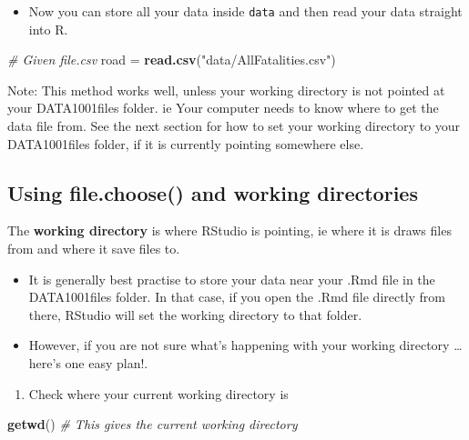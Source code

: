 \documentclass[]{article}
\newenvironment{Shaded}{\begin{snugshade}}{\end{snugshade}}
\newcommand{\CommentTok}[1]{\textcolor[rgb]{0.56,0.35,0.01}{\textit{#1}}}
\newcommand{\KeywordTok}[1]{\textcolor[rgb]{0.13,0.29,0.53}{\textbf{#1}}}
\newcommand{\NormalTok}[1]{#1}
\newcommand{\StringTok}[1]{\textcolor[rgb]{0.31,0.60,0.02}{#1}}
\providecommand{\tightlist}{%
  \setlength{\itemsep}{0pt}\setlength{\parskip}{0pt}}
\begin{document}
\begin{itemize}
\tightlist
\item
  Now you can store all your data inside \texttt{data} and then read your data straight into R.
\end{itemize}

\begin{Shaded}
\begin{Highlighting}[]
\CommentTok{# Given file.csv}
\NormalTok{road =}\StringTok{ }\KeywordTok{read.csv}\NormalTok{(}\StringTok{"data/AllFatalities.csv"}\NormalTok{)}
\end{Highlighting}
\end{Shaded}

Note: This method works well, unless your working directory is not pointed at your DATA1001files folder. ie Your computer needs to know where to get the data file from. See the next section for how to set your working directory to your DATA1001files folder, if it is currently pointing somewhere else.

\hypertarget{using-file.choose-and-working-directories}{%
\subsection{Using file.choose() and working directories}\label{using-file.choose-and-working-directories}}

The \textbf{working directory} is where RStudio is pointing, ie where it is draws files from and where it save files to.

\begin{itemize}
\tightlist
\item
  It is generally best practise to store your data near your .Rmd file in the DATA1001files folder. In that case, if you open the .Rmd file directly from there, RStudio will set the working directory to that folder.
\item
  However, if you are not sure what's happening with your working directory \ldots{} here's one easy plan!.
\end{itemize}

\begin{enumerate}
\def\labelenumi{(\arabic{enumi})}
\tightlist
\item
  Check where your current working directory is
\end{enumerate}

\begin{Shaded}
\begin{Highlighting}[]
\KeywordTok{getwd}\NormalTok{()  }\CommentTok{# This gives the current working directory}
\end{Highlighting}
\end{Shaded}
\end{document}
